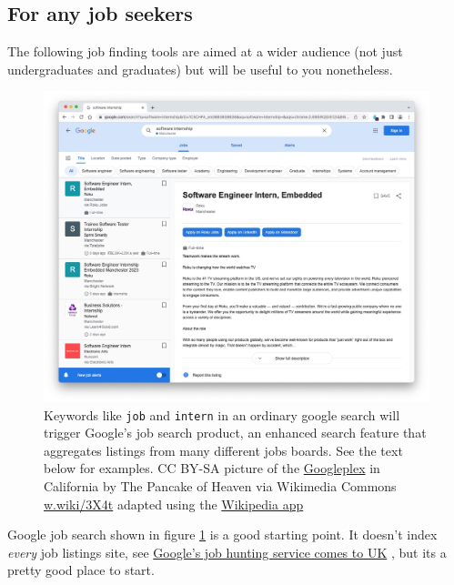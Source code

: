 \documentclass[
]{book}
\begin{document}
\hypertarget{generaljobs}{%
\subsection{For any job seekers}\label{generaljobs}}

The following job finding tools are aimed at a wider audience (not just undergraduates and graduates) but will be useful to you nonetheless.

\begin{figure}

{\centering \includegraphics[width=0.9\linewidth]{images/google-job-search} 

}

\caption{Keywords like \texttt{job} and \texttt{intern} in an ordinary google search will trigger Google's job search product, an enhanced search feature that aggregates listings from many different jobs boards. See the text below for examples. CC BY-SA picture of the \href{https://en.wikipedia.org/wiki/Googleplex}{Googleplex} in California by The Pancake of Heaven via Wikimedia Commons \href{https://w.wiki/3X4t}{w.wiki/3X4t} adapted using the \href{https://apps.apple.com/us/app/wikipedia/id324715238}{Wikipedia app}}\label{fig:googlejobs-fig}
\end{figure}



Google job search shown in figure \ref{fig:googlejobs-fig} is a good starting point. It doesn't index \emph{every} job listings site, see \href{https://www.bbc.co.uk/news/technology-44853472}{Google's job hunting service comes to UK} \citep{noindeed}, but its a pretty good place to start.
\end{document}
